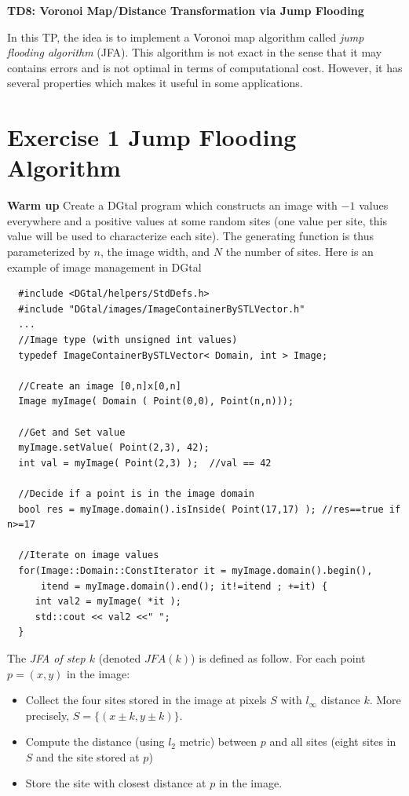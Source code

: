 \documentclass[a4paper, 11pt]{article}
\title{}
\author{}
\date{}
\begin{document}
\begin{center}
	\LARGE \textbf{TD8: Voronoi Map/Distance Transformation via Jump Flooding}
\end{center}

\bigskip
\par In this TP, the idea is to implement a Voronoi map algorithm called \emph{jump flooding algorithm} (JFA). This algorithm is not exact in the sense that it may contains errors and is not optimal in terms of computational cost. However, it has several properties which makes it useful in some applications.



\section*{Exercise 1 \rm Jump Flooding Algorithm}

{\bf Warm up} Create a DGtal program which constructs an image with $-1$  values everywhere and a positive  values at some random sites (one value per site, this value will be used to characterize each site). The generating function is thus parameterized by $n$, the image width, and $N$ the number of sites. Here is an example of image management in DGtal
\begin{verbatim}
  #include <DGtal/helpers/StdDefs.h>
  #include "DGtal/images/ImageContainerBySTLVector.h"
  ...
  //Image type (with unsigned int values)
  typedef ImageContainerBySTLVector< Domain, int > Image;

  //Create an image [0,n]x[0,n]
  Image myImage( Domain ( Point(0,0), Point(n,n)));

  //Get and Set value
  myImage.setValue( Point(2,3), 42);
  int val = myImage( Point(2,3) );  //val == 42

  //Decide if a point is in the image domain
  bool res = myImage.domain().isInside( Point(17,17) ); //res==true if n>=17

  //Iterate on image values
  for(Image::Domain::ConstIterator it = myImage.domain().begin(),
      itend = myImage.domain().end(); it!=itend ; +=it) {
     int val2 = myImage( *it );
     std::cout << val2 <<" ";
  }
\end{verbatim}


\par The \emph{JFA of step $k$} (denoted $JFA(k)$) is defined as follow. For each point $p=(x,y)$ in the image:
	\begin{itemize}
	\item Collect the four sites stored in the image at pixels $S$
          with  $l_\infty$  distance $k$. More precisely, $S=\{ (x \pm k,y\pm k)\}$.
	\item Compute the distance (using $l_2$ metric) between $p$ and all sites (eight sites in $S$ and the site stored at $p$)
	\item Store the site with closest distance at $p$ in the image.
	\end{itemize}
\end{document}
